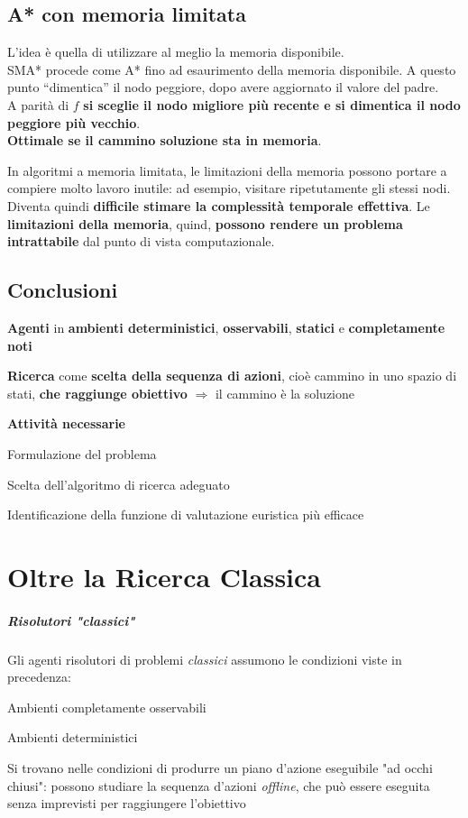 \documentclass[10pt]{book}
\begin{document}
\section{A* con memoria limitata}
L'idea è quella di utilizzare al meglio la memoria disponibile.\\
SMA* procede come A* fino ad esaurimento della memoria disponibile. A questo punto “dimentica” il nodo peggiore, dopo avere aggiornato il valore del padre.\\
A parità di $f$ \textbf{si sceglie il nodo migliore più recente e si dimentica il nodo peggiore più vecchio}.\\
\textbf{Ottimale se il cammino soluzione sta in memoria}.\\
\pagebreak

In algoritmi a memoria limitata, le limitazioni della memoria possono portare a compiere molto lavoro inutile: ad esempio, visitare ripetutamente gli stessi nodi. Diventa quindi \textbf{difficile stimare la complessità temporale effettiva}. Le \textbf{limitazioni della memoria}, quind, \textbf{possono rendere un problema intrattabile} dal punto di vista computazionale.
\section{Conclusioni}
\begin{list}{}{}
	\item \textbf{Agenti} in \textbf{ambienti deterministici}, \textbf{osservabili}, \textbf{statici} e \textbf{completamente noti}
	\item \textbf{Ricerca} come \textbf{scelta della sequenza di azioni}, cioè cammino in uno spazio di stati, \textbf{che raggiunge obiettivo} $\Rightarrow$ il cammino è la soluzione
	\item \textbf{Attività necessarie}
	\begin{list}{}{}
		\item Formulazione del problema
		\item Scelta dell'algoritmo di ricerca adeguato
		\item Identificazione della funzione di valutazione euristica più efficace
	\end{list}
\end{list}
\chapter{Oltre la Ricerca Classica}
\paragraph{Risolutori "classici"} Gli agenti risolutori di problemi \textit{classici} assumono le condizioni viste in precedenza:
\begin{list}{}{}
	\item Ambienti completamente osservabili
	\item Ambienti deterministici
	\item Si trovano nelle condizioni di produrre un piano d'azione eseguibile "ad occhi chiusi": possono studiare la sequenza d'azioni \textit{offline}, che può essere eseguita senza imprevisti per raggiungere l'obiettivo
\end{list}
\end{document}
